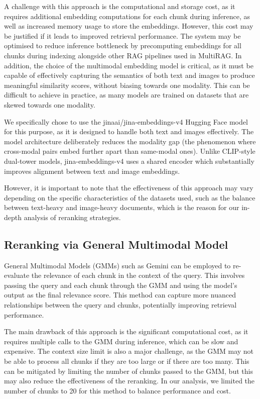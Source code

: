 \documentclass[12pt,twoside]{report}
\begin{document}
A challenge with this approach is the computational and storage cost, as it requires additional embedding computations for each chunk during inference, as well as increased memory usage to store the embeddings. However, this cost may be justified if it leads to improved retrieval performance. The system may be optimised to reduce inference bottleneck by precomputing embeddings for all chunks during indexing alongside other RAG pipelines used in MultiRAG. In addition, the choice of the multimodal embedding model is critical, as it must be capable of effectively capturing the semantics of both text and images to produce meaningful similarity scores, without biasing towards one modality. This can be difficult to achieve in practice, as many models are trained on datasets that are skewed towards one modality.

We specifically chose to use the jinaai/jina-embeddings-v4 Hugging Face model for this purpose\cite{JinaV4HF}, as it is designed to handle both text and images effectively.\cite{JinaV4} The model architecture deliberately reduces the modality gap (the phenomenon where cross-modal pairs embed further apart than same-modal ones). Unlike CLIP-style dual-tower models, jina-embeddings-v4 uses a shared encoder which substantially improves alignment between text and image embeddings.

However, it is important to note that the effectiveness of this approach may vary depending on the specific characteristics of the datasets used, such as the balance between text-heavy and image-heavy documents, which is the reason for our in-depth analysis of reranking strategies.

\subsection{Reranking via General Multimodal Model}
General Multimodal Models (GMMs) such as Gemini\cite{GeminiModel} can be employed to re-evaluate the relevance of each chunk in the context of the query. This involves passing the query and each chunk through the GMM and using the model's output as the final relevance score. This method can capture more nuanced relationships between the query and chunks, potentially improving retrieval performance.

The main drawback of this approach is the significant computational cost, as it requires multiple calls to the GMM during inference, which can be slow and expensive. The context size limit is also a major challenge, as the GMM may not be able to process all chunks if they are too large or if there are too many. This can be mitigated by limiting the number of chunks passed to the GMM, but this may also reduce the effectiveness of the reranking. In our analysis, we limited the number of chunks to 20 for this method to balance performance and cost.
\end{document}
